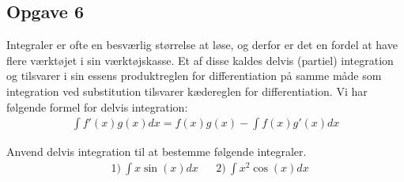 \subsection*{Opgave 6}
Integraler er ofte en besværlig størrelse at løse, og derfor er det en fordel at have flere værktøjet i sin værktøjskasse. Et af disse kaldes delvis (partiel) integration og tilsvarer i sin essens produktreglen for differentiation på samme måde som integration ved substitution tilsvarer kædereglen for differentiation. Vi har følgende formel for delvis integration:
\begin{align*}
	\int f'(x)g(x) dx = f(x)g(x) - \int f(x)g'(x) dx
\end{align*}

Anvend delvis integration til at bestemme følgende integraler. 
\begin{align*}
	&1) \  \int x\sin(x) dx   &&2) \  \int x^2\cos(x) dx  \\
\end{align*}
